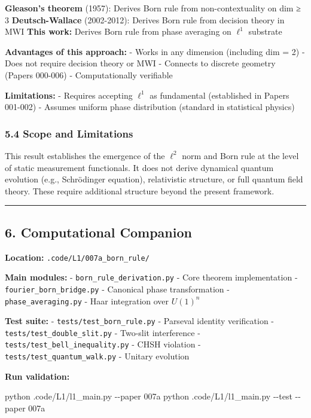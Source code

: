 \documentclass[
]{article}
\newenvironment{Shaded}{}{}
\newcommand{\AttributeTok}[1]{\textcolor[rgb]{0.49,0.56,0.16}{#1}}
\newcommand{\ExtensionTok}[1]{#1}
\newcommand{\NormalTok}[1]{#1}
\begin{document}
\textbf{Gleason's theorem} (1957): Derives Born rule from
non-contextuality on dim ≥ 3 \textbf{Deutsch-Wallace} (2002-2012):
Derives Born rule from decision theory in MWI \textbf{This work:}
Derives Born rule from phase averaging on \(\ell^1\) substrate

\textbf{Advantages of this approach:} - Works in any dimension
(including dim = 2) - Does not require decision theory or MWI - Connects
to discrete geometry (Papers 000-006) - Computationally verifiable

\textbf{Limitations:} - Requires accepting \(\ell^1\) as fundamental
(established in Papers 001-002) - Assumes uniform phase distribution
(standard in statistical physics)

\subsubsection{5.4 Scope and Limitations}\label{scope-and-limitations}

This result establishes the emergence of the \(\ell^2\) norm and Born
rule at the level of static measurement functionals. It does not derive
dynamical quantum evolution (e.g., Schrödinger equation), relativistic
structure, or full quantum field theory. These require additional
structure beyond the present framework.

\begin{center}\rule{0.5\linewidth}{0.5pt}\end{center}

\subsection{6. Computational Companion}\label{computational-companion}

\textbf{Location:} \texttt{.code/L1/007a\_born\_rule/}

\textbf{Main modules:} - \texttt{born\_rule\_derivation.py} - Core
theorem implementation - \texttt{fourier\_born\_bridge.py} - Canonical
phase transformation - \texttt{phase\_averaging.py} - Haar integration
over \(U(1)^n\)

\textbf{Test suite:} - \texttt{tests/test\_born\_rule.py} - Parseval
identity verification - \texttt{tests/test\_double\_slit.py} - Two-slit
interference - \texttt{tests/test\_bell\_inequality.py} - CHSH violation
- \texttt{tests/test\_quantum\_walk.py} - Unitary evolution

\textbf{Run validation:}

\begin{Shaded}
\begin{Highlighting}[]
\ExtensionTok{python}\NormalTok{ .code/L1/l1\_main.py }\AttributeTok{{-}{-}paper}\NormalTok{ 007a}
\ExtensionTok{python}\NormalTok{ .code/L1/l1\_main.py }\AttributeTok{{-}{-}test} \AttributeTok{{-}{-}paper}\NormalTok{ 007a}
\end{Highlighting}
\end{Shaded}
\end{document}
